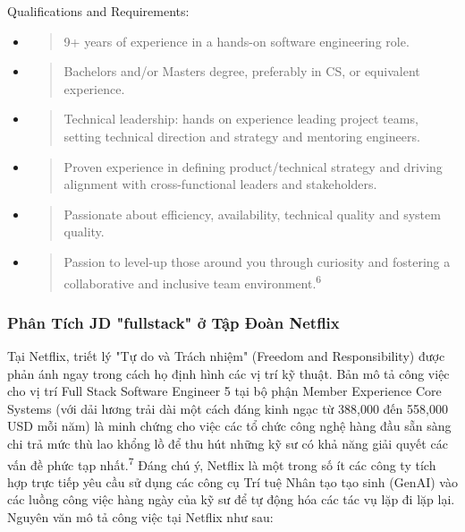\documentclass[12pt,a4paper]{article}
\begin{document}
Qualifications and Requirements:

\begin{itemize}
\item
  \begin{quote}
  9+ years of experience in a hands-on software engineering role.
  \end{quote}
\item
  \begin{quote}
  Bachelor\textquotesingle s and/or Master\textquotesingle s degree,
  preferably in CS, or equivalent experience.
  \end{quote}
\item
  \begin{quote}
  Technical leadership: hands on experience leading project teams,
  setting technical direction and strategy and mentoring engineers.
  \end{quote}
\item
  \begin{quote}
  Proven experience in defining product/technical strategy and driving
  alignment with cross-functional leaders and stakeholders.
  \end{quote}
\item
  \begin{quote}
  Passionate about efficiency, availability, technical quality and
  system quality.
  \end{quote}
\item
  \begin{quote}
  Passion to level-up those around you through curiosity and fostering a
  collaborative and inclusive team environment.\textsuperscript{6}
  \end{quote}
\end{itemize}

\subsubsection{Phân Tích JD "fullstack" ở Tập Đoàn Netflix}

Tại Netflix, triết lý "Tự do và Trách nhiệm" (Freedom and
Responsibility) được phản ánh ngay trong cách họ định hình các vị trí kỹ
thuật. Bản mô tả công việc cho vị trí Full Stack Software Engineer 5 tại
bộ phận Member Experience Core Systems (với dải lương trải dài một cách
đáng kinh ngạc từ 388,000 đến 558,000 USD mỗi năm) là minh chứng cho
việc các tổ chức công nghệ hàng đầu sẵn sàng chi trả mức thù lao khổng
lồ để thu hút những kỹ sư có khả năng giải quyết các vấn đề phức tạp
nhất.\textsuperscript{7} Đáng chú ý, Netflix là một trong số ít các công
ty tích hợp trực tiếp yêu cầu sử dụng các công cụ Trí tuệ Nhân tạo tạo
sinh (GenAI) vào các luồng công việc hàng ngày của kỹ sư để tự động hóa
các tác vụ lặp đi lặp lại. Nguyên văn mô tả công việc tại Netflix như sau:
\end{document}
